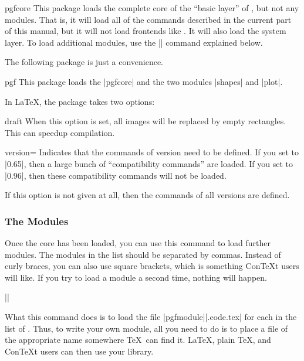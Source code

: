 \begin{package}{pgfcore}
    This package loads the complete core of the ``basic layer'' of \pgfname,
    but not any modules. That is, it will load all of the commands described in
    the current part of this manual, but it will not load frontends like
    \tikzname. It will also load the system layer. To load additional modules,
    use the |\usepgfmodule| command explained below.
\end{package}

The following package is just a convenience.

\begin{package}{pgf}
    This package loads the |pgfcore| and the two modules |shapes| and |plot|.

    In \LaTeX, the package takes two options:
    \begin{packageoption}{draft}
        When this option is set, all images will be replaced by empty
        rectangles. This can speedup compilation.
    \end{packageoption}

    \begin{packageoption}{version=}
        Indicates that the commands of version  need to be
        defined. If you set  to |0.65|, then a large bunch of
        ``compatibility commands'' are loaded. If you set  to
        |0.96|, then these compatibility commands will not be loaded.

        If this option is not given at all, then the commands of all versions
        are defined.
    \end{packageoption}
\end{package}


\subsubsection{The Modules}

\begin{command}{\usepgfmodule{}}
    Once the core has been loaded, you can use this command to load further
    modules. The modules in the  list should be separated by
    commas. Instead of curly braces, you can also use square brackets, which is
    something Con\TeX t users will like. If you try to load a module a second
    time, nothing will happen.

    \example ||

    What this command does is to load the file
    |pgfmodule||.code.tex| for each  in the list of
    . Thus, to write your own module, all you need to do is
    to place a file of the appropriate name somewhere \TeX\ can find it.
    \LaTeX, plain \TeX, and Con\TeX t users can then use your library.
\end{command}

